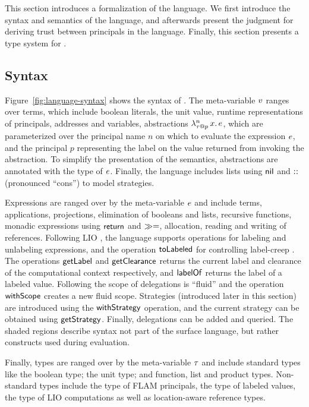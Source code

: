 This section introduces a formalization of the \lang{} language. We first introduce the syntax and semantics of the language, and afterwards present the judgment for deriving trust between principals in the language. Finally, this section presents a type system for \lang. 

\subsection{Syntax}

Figure~\ref{fig:language-syntax} shows the syntax of \lang. The meta-variable $v$ ranges over terms, which include boolean literals, the unit value, runtime representations of principals, addresses and variables, abstractions $\lambda^{n}_{\tau \mathbin{@} p}\,x.\,e$, which are parameterized over the principal name $n$ on which to evaluate the expression $e$, and the principal $p$ representing the label on the value returned from invoking the abstraction. To simplify the presentation of the semantics, abstractions are annotated with the type of $e$. Finally, the language includes lists using $\mathsf{nil}$ and $\mathbin{::}$ (pronounced ``cons'') to model strategies.

Expressions are ranged over by the meta-variable $e$ and include terms, applications, projections, elimination of booleans and lists, recursive functions, monadic expressions using $\mathsf{return}$ and $\gg=$, allocation, reading and writing of references. Following LIO \cite{SRMMlio}, the language supports operations for labeling and unlabeling expressions, and the operation $\mathsf{toLabeled}$ for controlling label-creep \cite{SRMMlio}. The operations $\mathsf{getLabel}$ and $\mathsf{getClearance}$ returns the current label and clearance of the computational context respectively, and $\mathsf{labelOf}$ returns the label of a labeled value. Following \cite{Moore:2016:EAC:2983990.2984021} the scope of delegations is ``fluid'' and the operation $\mathsf{withScope}$ creates a new fluid scope. Strategies (introduced later in this section) are introduced using the $\mathsf{withStrategy}$ operation, and the current strategy can be obtained using $\mathsf{getStrategy}$. Finally, delegations can be added and queried. The shaded regions describe syntax not part of the surface language, but rather constructs used during evaluation.

Finally, types are ranged over by the meta-variable $\tau$ and include standard types like the boolean type; the unit type; and function, list and product types. Non-standard types include the type of FLAM principals, the type of labeled values, the type of LIO computations as well as location-aware reference types.

